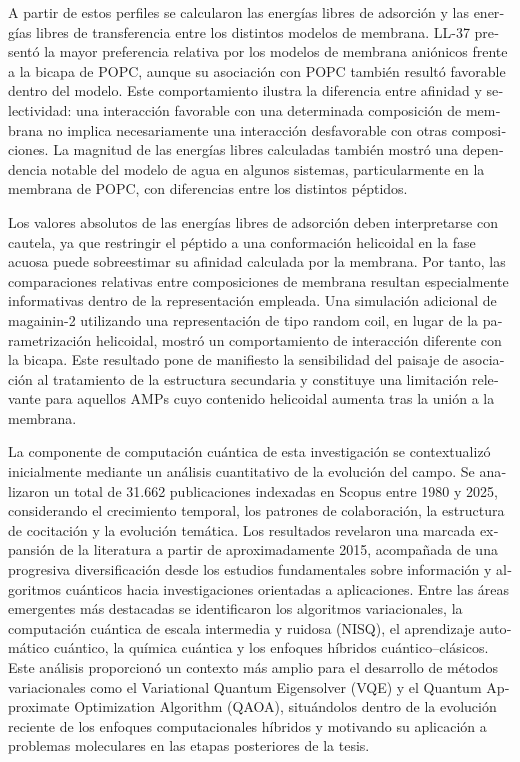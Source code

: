 \begin{otherlanguage}{spanish}
A partir de estos perfiles se calcularon las energías libres de adsorción y las energías libres de transferencia entre los distintos modelos de membrana. LL-37 presentó la mayor preferencia relativa por los modelos de membrana aniónicos frente a la bicapa de POPC, aunque su asociación con POPC también resultó favorable dentro del modelo. Este comportamiento ilustra la diferencia entre afinidad y selectividad: una interacción favorable con una determinada composición de membrana no implica necesariamente una interacción desfavorable con otras composiciones. La magnitud de las energías libres calculadas también mostró una dependencia notable del modelo de agua en algunos sistemas, particularmente en la membrana de POPC, con diferencias entre los distintos péptidos.

Los valores absolutos de las energías libres de adsorción deben interpretarse con cautela, ya que restringir el péptido a una conformación helicoidal en la fase acuosa puede sobreestimar su afinidad calculada por la membrana. Por tanto, las comparaciones relativas entre composiciones de membrana resultan especialmente informativas dentro de la representación empleada. Una simulación adicional de magainin-2 utilizando una representación de tipo random coil, en lugar de la parametrización helicoidal, mostró un comportamiento de interacción diferente con la bicapa. Este resultado pone de manifiesto la sensibilidad del paisaje de asociación al tratamiento de la estructura secundaria y constituye una limitación relevante para aquellos AMPs cuyo contenido helicoidal aumenta tras la unión a la membrana.


La componente de computación cuántica de esta investigación se contextualizó inicialmente mediante un análisis cuantitativo de la evolución del campo. Se analizaron un total de 31.662 publicaciones indexadas en Scopus entre 1980 y 2025, considerando el crecimiento temporal, los patrones de colaboración, la estructura de cocitación y la evolución temática. Los resultados revelaron una marcada expansión de la literatura a partir de aproximadamente 2015, acompañada de una progresiva diversificación desde los estudios fundamentales sobre información y algoritmos cuánticos hacia investigaciones orientadas a aplicaciones. Entre las áreas emergentes más destacadas se identificaron los algoritmos variacionales, la computación cuántica de escala intermedia y ruidosa (NISQ), el aprendizaje automático cuántico, la química cuántica y los enfoques híbridos cuántico--clásicos. Este análisis proporcionó un contexto más amplio para el desarrollo de métodos variacionales como el Variational Quantum Eigensolver (VQE) y el Quantum Approximate Optimization Algorithm (QAOA), situándolos dentro de la evolución reciente de los enfoques computacionales híbridos y motivando su aplicación a problemas moleculares en las etapas posteriores de la tesis.


\end{otherlanguage}
